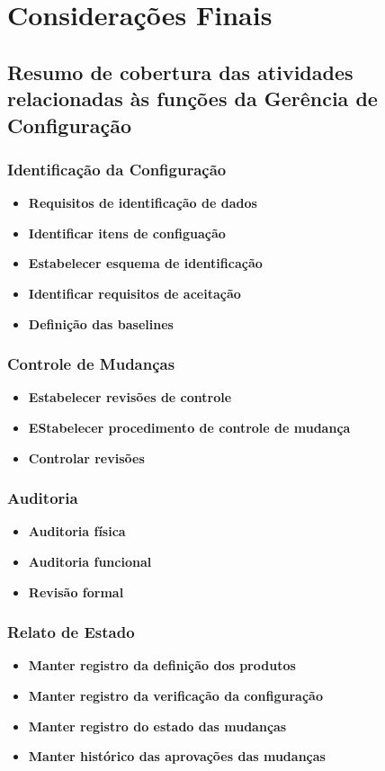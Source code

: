 \chapter[Considerações Finais]{Considerações Finais}

\section{Resumo de cobertura das atividades relacionadas às funções da Gerência de Configuração}
 \subsection{Identificação da Configuração}
 \begin{itemize}
 \item \textbf{Requisitos de identificação de dados}
 \item \textbf{Identificar itens de configuação}
 \item \textbf{Estabelecer esquema de identificação}
 \item \textbf{Identificar requisitos de aceitação}
 \item \textbf{Definição das baselines}
 \end{itemize}
 \subsection{Controle de Mudanças}
 \begin{itemize}
 \item \textbf{Estabelecer revisões de controle}
 \item \textbf{EStabelecer procedimento de controle de mudança}
 \item \textbf{Controlar revisões}
 \end{itemize}
 \subsection{Auditoria}
 \begin{itemize}
 \item \textbf{Auditoria física}
 \item \textbf{Auditoria funcional}
 \item \textbf{Revisão formal}
 \end{itemize}
 \subsection{Relato de Estado}
 \begin{itemize}
 \item \textbf{Manter registro da definição dos produtos}
 \item \textbf{Manter registro da verificação da configuração}
 \item \textbf{Manter registro do estado das mudanças}
 \item \textbf{Manter histórico das aprovações das mudanças}
 \end{itemize}
